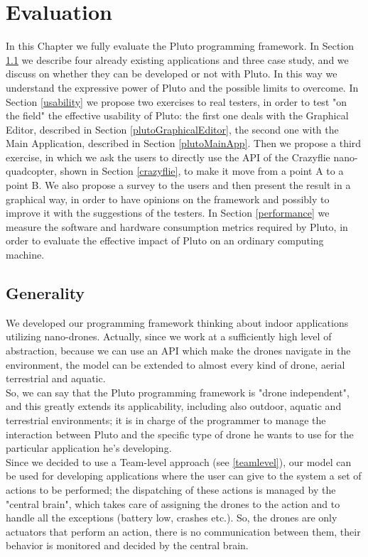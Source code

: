 \chapter{Evaluation}
\label{cap6}

In this Chapter we fully evaluate the Pluto programming framework.
In Section \ref{applicability} we describe four already existing applications and three case study, and we discuss on whether they can be developed or not with Pluto. 
In this way we understand the expressive power of Pluto and the possible limits to overcome.
In Section \ref{usability} we propose two exercises to real testers, in order to test "on the field" the effective usability of Pluto:
the first one deals with the Graphical Editor, described in Section \ref{plutoGraphicalEditor}, the second one with the Main Application, described in Section \ref{plutoMainApp}.
Then we propose a third exercise, in which we ask the users to directly use the API of the Crazyflie nano-quadcopter, shown in Section \ref{crazyflie}, to make it move from a point A to a point B.
We also propose a survey to the users and then present the result in a graphical way, in order to have opinions on the framework and possibly to improve it with the suggestions of the testers.
In Section \ref{performance} we measure the software and hardware consumption metrics required by Pluto, in order to evaluate the effective impact of Pluto on an ordinary computing machine.


\section{Generality}\label{applicability}

We developed our programming framework thinking about indoor applications utilizing nano-drones.
Actually, since we work at a sufficiently high level of abstraction, because we can use an API which make the drones navigate in the environment, the model can be extended to almost every kind of drone, aerial terrestrial and aquatic.
\\
So, we can say that the Pluto programming framework is "drone independent", and this greatly extends its applicability, including also outdoor, aquatic and terrestrial environments; it is in charge of the programmer to manage the interaction between Pluto and the specific type of drone he wants to use for the particular application he's developing.
\\

Since we decided to use a Team-level approach (see \ref{teamlevel}), our model can be used for developing applications where the user can give to the system a set of actions to be performed; the dispatching of these actions is managed by the "central brain", which takes care of assigning the drones to the action and to handle all the exceptions (battery low, crashes etc.). So, the drones are only actuators that perform an action, there is no communication between them, their behavior is monitored and decided by the central brain.
\\


